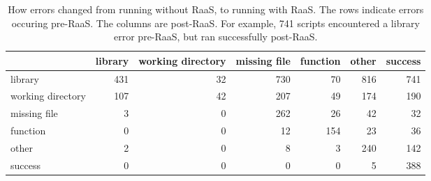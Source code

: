 \begin{table}
\centering
\caption{How errors changed from running without RaaS, to running with RaaS. The rows indicate errors occuring pre-RaaS. The columns are post-RaaS. For example, 741 scripts encountered a library error pre-RaaS, but ran successfully post-RaaS.}
\label{tab:error-change}
\begin{tabular}{lrrrrrr}
\toprule
{} &  library &  working directory &  missing file &  function &  other &  success \\
\midrule
library           &      431 &                 32 &           730 &        70 &    816 &      741 \\ \hline
working directory &      107 &                 42 &           207 &        49 &    174 &      190 \\ \hline
missing file      &        3 &                  0 &           262 &        26 &     42 &       32 \\ \hline
function          &        0 &                  0 &            12 &       154 &     23 &       36 \\ \hline
other             &        2 &                  0 &             8 &         3 &    240 &      142 \\ \hline
success           &        0 &                  0 &             0 &         0 &      5 &      388 \\
\bottomrule
\end{tabular}
\end{table}
